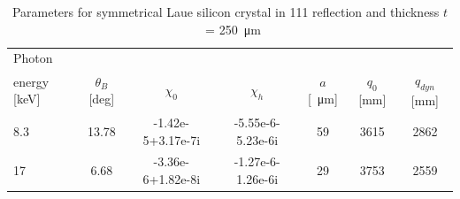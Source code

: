 \documentclass[preprint]{iucr}              %
\begin{document}

\begin{table}
\caption{Parameters for symmetrical Laue silicon crystal in 111 reflection and thickness $t$~= \SI{250}{\micro\meter}}
\begin{tabular}{lcccccc}
 Photon \\energy  [keV]  & $\theta_B$ [deg]       & $\chi_0$ & $\chi_h$ & $a$ [\SI{}{\micro\meter}]& $q_0$ [mm] & $q_{dyn}$  [mm] \\
\hline
 8.3  &  13.78 & -1.42e-5+3.17e-7i & -5.55e-6-5.23e-6i  & 59  & 3615  & 2862   \\
 17   &  6.68 & -3.36e-6+1.82e-8i & -1.27e-6-1.26e-6i  & 29  & 3753  & 2559 
\end{tabular}
\label{table:example}
\end{table}
\end{document}

